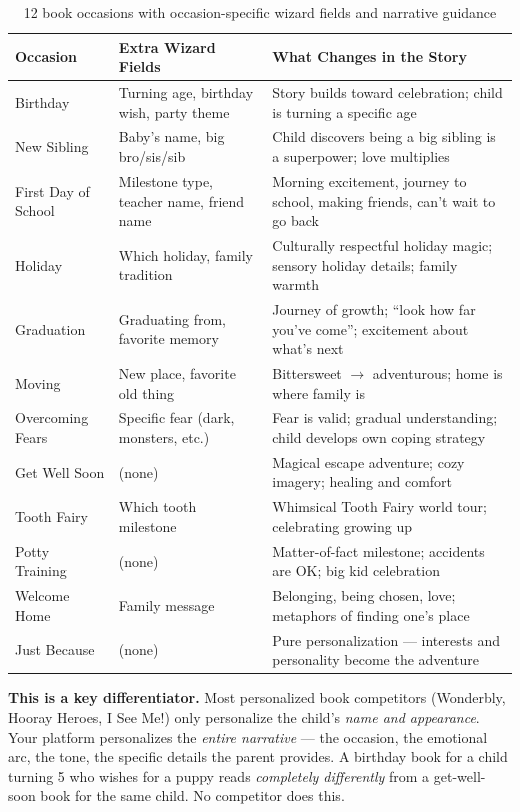 \documentclass[12pt, letterpaper, oneside]{book}
\begin{document}
\begin{table}[H]
\centering
\small
\begin{tabularx}{\textwidth}{lXX}
\toprule
\textbf{Occasion} & \textbf{Extra Wizard Fields} & \textbf{What Changes in the Story} \\
\midrule
Birthday & Turning age, birthday wish, party theme & Story builds toward celebration; child is turning a specific age \\
New Sibling & Baby's name, big bro/sis/sib & Child discovers being a big sibling is a superpower; love multiplies \\
First Day of School & Milestone type, teacher name, friend name & Morning excitement, journey to school, making friends, can't wait to go back \\
Holiday & Which holiday, family tradition & Culturally respectful holiday magic; sensory holiday details; family warmth \\
Graduation & Graduating from, favorite memory & Journey of growth; ``look how far you've come''; excitement about what's next \\
Moving & New place, favorite old thing & Bittersweet $\rightarrow$ adventurous; home is where family is \\
Overcoming Fears & Specific fear (dark, monsters, etc.) & Fear is valid; gradual understanding; child develops own coping strategy \\
Get Well Soon & (none) & Magical escape adventure; cozy imagery; healing and comfort \\
Tooth Fairy & Which tooth milestone & Whimsical Tooth Fairy world tour; celebrating growing up \\
Potty Training & (none) & Matter-of-fact milestone; accidents are OK; big kid celebration \\
Welcome Home & Family message & Belonging, being chosen, love; metaphors of finding one's place \\
Just Because & (none) & Pure personalization --- interests and personality become the adventure \\
\bottomrule
\end{tabularx}
\caption{12 book occasions with occasion-specific wizard fields and narrative guidance}
\end{table}

\begin{successbox}
\textbf{This is a key differentiator.} Most personalized book competitors (Wonderbly, Hooray Heroes, I See Me!) only personalize the child's \textit{name and appearance}. Your platform personalizes the \textit{entire narrative} --- the occasion, the emotional arc, the tone, the specific details the parent provides. A birthday book for a child turning 5 who wishes for a puppy reads \textit{completely differently} from a get-well-soon book for the same child. No competitor does this.
\end{successbox}
\end{document}
